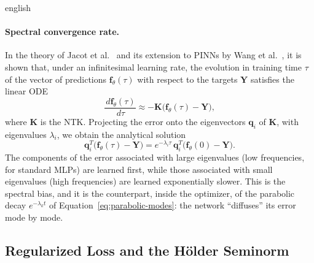 \documentclass[0000.tex]{subfiles}
\begin{document}
\begin{hyphenrules}{english}
\paragraph{Spectral convergence rate.}
In the theory of Jacot et al.~\cite{jacot2018} and its extension to PINNs by Wang et al.~\cite{wang2022ntk}, it is shown
that, under an infinitesimal learning rate, the evolution in training time $\tau$ of the vector of
predictions $\mathbf{f}_\theta(\tau)$ with respect to the targets $\mathbf{Y}$ satisfies the linear ODE
\begin{equation}
  \frac{\,d\mathbf{f}_\theta(\tau)}{\,d\tau}\approx-\mathbf{K}\big(\mathbf{f}_\theta(\tau)-\mathbf{Y}\big),
  \label{eq:ntk-ode}
\end{equation}
where $\mathbf{K}$ is the NTK. Projecting the error onto the eigenvectors $\mathbf{q}_i$ of $\mathbf{K}$,
with eigenvalues $\lambda_i$, we obtain the analytical solution
\begin{equation}
  \mathbf{q}_i^{T}\big(\mathbf{f}_\theta(\tau)-\mathbf{Y}\big)=e^{-\lambda_i\tau}\,\mathbf{q}_i^{T}\big(\mathbf{f}_\theta(0)-\mathbf{Y}\big).
  \label{eq:ntk-modes}
\end{equation}
The components of the error associated with large eigenvalues (low frequencies, for standard MLPs)
are learned first, while those associated with small eigenvalues (high frequencies) are learned
exponentially slower. This is the spectral bias, and it is the counterpart, inside the optimizer, of
the parabolic decay $e^{-\lambda_k t}$ of Equation~\eqref{eq:parabolic-modes}: the network ``diffuses'' its error
mode by mode.

\subsection{Regularized Loss and the Hölder Seminorm}


\end{hyphenrules}
\end{document}
